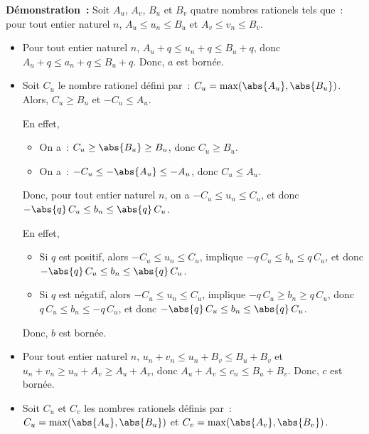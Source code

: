 \noindent\textbf{Démonstration :}
    Soit $A_u$, $A_v$, $B_u$ et $B_v$ quatre nombres rationels tels que~: pour tout entier naturel $n$, $A_u \leq u_n \leq B_u$ et $A_v \leq v_n \leq B_v$.
    \begin{itemize}[nosep]
        \item Pour tout entier naturel $n$, $A_u + q \leq u_n + q \leq B_u + q$, donc $A_u + q \leq a_n + q \leq B_u + q$.
            Donc, $a$ est bornée.
        \item Soit $C_u$ le nombre rationel défini par : $C_u = \mathrm{max}(\abs{A_u}, \abs{B_u})$.
            Alors, $C_u \geq B_u$ et $-C_u \leq A_u$.%
            \begin{foot}
                En effet, 
                \begin{itemize}[nosep]
                    \item On a~: $C_u \geq \abs{B_u} \geq B_u$, donc $C_u \geq B_u$.
                    \item On a~: $-C_u \leq -\abs{A_u} \leq -A_u$, donc $C_u \leq A_u$.
                \end{itemize}
            \end{foot} 
            Donc, pour tout entier naturel $n$, on a $-C_u \leq u_n \leq C_u$, et donc $- \abs{q} \, C_u \leq b_n \leq \abs{q} \, C_u$.%
            \begin{foot}
                En effet, 
                \begin{itemize}
                    \item Si $q$ est positif, alors $-C_u \leq u_n \leq C_u$, implique $- q \, C_u \leq b_n \leq q \, C_u$, et donc $- \abs{q} \, C_u \leq b_n \leq \abs{q} \, C_u$. 
                    \item Si $q$ est négatif, alors $-C_u \leq u_n \leq C_u$, implique $- q \, C_u \geq b_n \geq q \, C_u$, donc $q \, C_u \leq b_n \leq -q \, C_u$, et donc $- \abs{q} \, C_u \leq b_n \leq \abs{q} \, C_u$. 
                \end{itemize}
            \end{foot}
            Donc, $b$ est bornée.
        \item Pour tout entier naturel $n$, $u_n + v_n \leq u_n + B_v \leq B_u + B_v$ et $u_n + v_n \geq u_n + A_v \geq A_u + A_v$, donc $A_u + A_v \leq c_n \leq B_u + B_v$. 
            Donc, $c$ est bornée.
        \item Soit $C_u$ et $C_v$ les nombres rationels définis par : $C_u = \mathrm{max}(\abs{A_u}, \abs{B_u})$ et $C_v = \mathrm{max}(\abs{A_v}, \abs{B_v})$.

\end{itemize}
